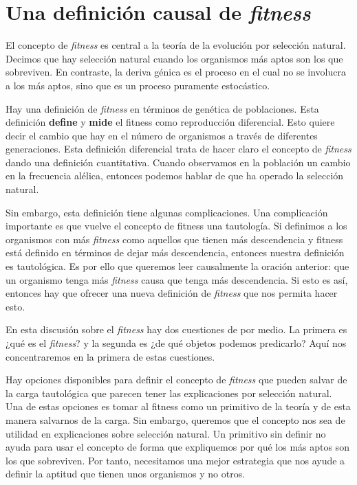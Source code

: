 
\chapter{Una definición causal de \emph{fitness}}


\noindent El concepto de \emph{fitness} es central a la teoría de la evolución por selección natural. Decimos que hay selección natural cuando los organismos más aptos son los que sobreviven. En contraste, la deriva génica es el proceso en el cual no se involucra a los más aptos, sino que es un proceso puramente estocástico.

Hay una definición de \emph{fitness} en términos de genética de poblaciones. Esta definición \textbf{define} y \textbf{mide} el fitness como reproducción diferencial. Esto quiere decir el cambio que hay en el número de organismos a través de diferentes generaciones. Esta definición diferencial trata de hacer claro el concepto de \emph{fitness} dando una definición cuantitativa. Cuando observamos en la población un cambio en la frecuencia alélica, entonces podemos hablar de que ha operado la selección natural.

Sin embargo, esta definición tiene algunas complicaciones. Una complicación importante es que vuelve el concepto de fitness una tautología. Si definimos a los organismos con más \emph{fitness} como aquellos que tienen más descendencia y fitness está definido en términos de dejar más descendencia, entonces nuestra definición es tautológica. Es por ello que queremos leer causalmente la oración anterior: que un organismo tenga más \emph{fitness} causa que tenga más descendencia. Si esto es así, entonces hay que ofrecer una nueva definición de \emph{fitness} que nos permita hacer esto.

En esta discusión sobre el \emph{fitness} hay dos cuestiones de por medio. La primera es ¿qué es el \emph{fitness}? y la segunda es ¿de qué objetos podemos predicarlo? Aquí nos concentraremos en la primera de estas cuestiones.

Hay opciones disponibles para definir el concepto de \emph{fitness} que pueden salvar de la carga tautológica que parecen tener las explicaciones por selección natural. Una de estas opciones es tomar al fitness como un primitivo de la teoría y de esta manera salvarnos de la carga. Sin embargo, queremos que el concepto nos sea de utilidad en explicaciones sobre selección natural. Un primitivo sin definir no ayuda para usar el concepto de forma que expliquemos por qué los más aptos son los que sobreviven. Por tanto, necesitamos una mejor estrategia que nos ayude a definir la aptitud que tienen unos organismos y no otros.

